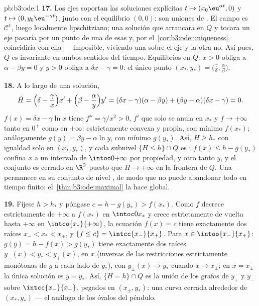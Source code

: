 \begin{solution}{pb:b3:ode:1}
\textbf{17.} Los ejes soportan las soluciones explícitas $t
\mapsto (x_0\eu^{\alpha t}, 0)$ y $t \mapsto (0,
y_0\eu^{-\gamma t})$, junto con el equilibrio $(0, 0)$: son uniones de
. El campo es $\mathcal
C^1$, luego localmente lipschitziano; una
solución que arrancara en $Q$ y tocara un eje pasaría por un punto de
una de esas  y, por
el~\cref{cor:b3:ode:uniqueness}, coincidiría con ella --- imposible,
viviendo una sobre el eje y la otra no. Así pues, $Q$ es invariante en
ambos sentidos del tiempo. Equilibrios en $Q$: $x > 0$ obliga a
$\alpha - \beta y = 0$ y $y > 0$ obliga a $\delta x - \gamma = 0$: el
único punto
$(x_*, y_*) = \bigl(\frac\gamma\delta,
\frac\alpha\beta\bigr)$.

\textbf{18.} A lo largo de una solución,
\[
\dot H = \Bigl(\delta - \frac\gamma x\Bigr)x' +
\Bigl(\beta - \frac\alpha y\Bigr)y'
= (\delta x - \gamma)(\alpha - \beta y) +
(\beta y - \alpha)(\delta x - \gamma) = 0 .
\]
$f(x) = \delta x - \gamma\ln x$ tiene $f'' = \gamma/x^2 > 0$, $f'$ que
solo se anula en $x_*$ y $f \to +\infty$ tanto en $0^+$ como en
$+\infty$: estrictamente convexa y propia, con mínimo $f(x_*)$;
análogamente $g(y) = \beta y - \alpha\ln y$, con mínimo $g(y_*)$. Así,
$H \geq h_*$ con igualdad solo en $(x_*,
y_*)$, y cada subnivel $\{H \leq h\}\cap Q$ es
: $f(x) \leq h - g(y_*)$
confina $x$ a un intervalo  de
$\intoo0{+\infty}$ por propiedad, y otro tanto $y$, y el conjunto es
cerrado en $\R^2$ puesto que $H \to +\infty$ en la frontera de $Q$. Una
 permanece en su conjunto
de nivel , de modo que no
puede abandonar todo  en
tiempo finito: el~\cref{thm:b3:ode:maximal} la hace global.

\textbf{19.} Fíjese $h > h_*$ y póngase $c = h - g(y_*) >
f(x_*)$. Como $f$ decrece estrictamente de $+\infty$ a $f(x_*)$ en
$\intoc0{x_*}$ y crece estrictamente de vuelta hasta $+\infty$ en
$\intco{x_*}{+\infty}$, la ecuación $f(x) = c$ tiene exactamente dos
raíces $x_- < x_* < x_+$, y $\{f \leq c\} =
\intcc{x_-}{x_+}$. Para $x \in \intoo{x_-}{x_+}$: $g(y) = h -
f(x) > g(y_*)$ tiene exactamente dos raíces $y_-(x) < y_* <
y_+(x)$,  en $x$ (inversas
de las restricciones 
estrictamente monótonas de $g$ a cada lado de $y_*$), con
$y_\pm(x) \to y_*$ cuando $x \to x_\pm$; en $x =
x_\pm$ la única solución es $y = y_*$. Así, $\{H = h\}\cap
Q$ es la unión de los grafos de $y_+$ y $y_-$ sobre $\intcc{x_-}{x_+}$,
pegados en $(x_\pm, y_*)$: una curva cerrada alrededor de $(x_*, y_*)$
--- el análogo de los óvalos del péndulo.


\end{solution}
